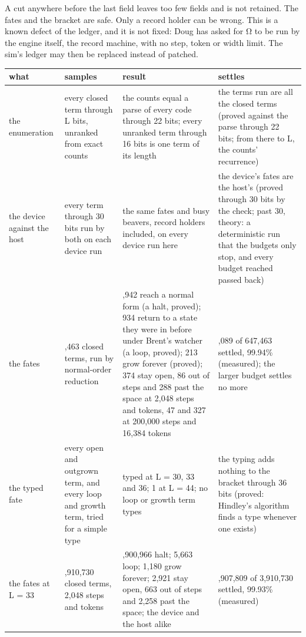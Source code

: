 A cut anywhere before the last field leaves too few fields and is not retained. The fates and the bracket are safe. Only a record holder can be wrong. This is a known defect of the ledger, and it is not fixed: Doug has asked for Ω to be run by the engine itself, the record machine, with no step, token or width limit. The sim's ledger may then be replaced instead of patched.

{\footnotesize
\setlength{\tabcolsep}{6pt}
\begin{longtable}{>{\RaggedRight\arraybackslash}p{}>{\RaggedRight\arraybackslash}p{}>{\RaggedRight\arraybackslash}p{}>{\RaggedRight\arraybackslash}p{}}
\toprule
what & samples & result & settles \\
\midrule
\endhead
the enumeration & every closed term through L bits, unranked from exact counts & the counts equal a parse of every code through 22 bits; every unranked term through 16 bits is one term of its length & the terms run are all the closed terms (proved against the parse through 22 bits; from there to L, the counts' recurrence) \\
the device against the host & every term through 30 bits run by both on each device run & the same fates and busy beavers, record holders included, on every device run here & the device's fates are the host's (proved through 30 bits by the check; past 30, theory: a deterministic run that the budgets only stop, and every budget reached passed back) \\
the fates & 647,463 closed terms, run by normal-order reduction & 645,942 reach a normal form (a halt, proved); 934 return to a state they were in before under Brent's watcher (a loop, proved); 213 grow forever (proved); 374 stay open, 86 out of steps and 288 past the space at 2,048 steps and tokens, 47 and 327 at 200,000 steps and 16,384 tokens & 647,089 of 647,463 settled, 99.94\% (measured); the larger budget settles no more \\
the typed fate & every open and outgrown term, and every loop and growth term, tried for a simple type & 0 typed at L = 30, 33 and 36; 1 at L = 44; no loop or growth term types & the typing adds nothing to the bracket through 36 bits (proved: Hindley's algorithm finds a type whenever one exists) \\
the fates at L = 33 & 3,910,730 closed terms, 2,048 steps and tokens & 3,900,966 halt; 5,663 loop; 1,180 grow forever; 2,921 stay open, 663 out of steps and 2,258 past the space; the device and the host alike & 3,907,809 of 3,910,730 settled, 99.93\% (measured) \\

\end{longtable}}
